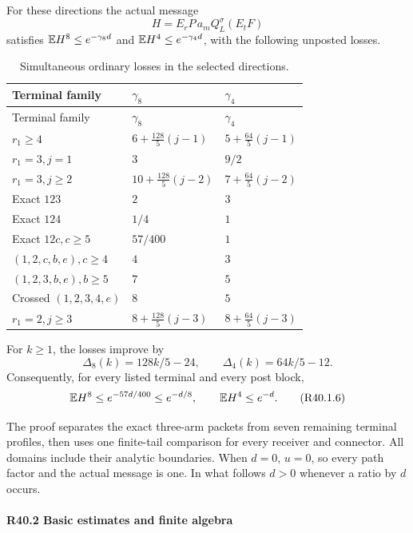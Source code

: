 \begin{proposition}\label{prop:r40:ordinary-catalogue}
For these directions the actual message
\[
 H=E_rP\,a_mQ_L^\sigma(E_tF)
 \tag{R40.1.5}
\]
satisfies \(\mathbb E H^8\le e^{-\gamma_8d}\) and
\(\mathbb E H^4\le e^{-\gamma_4d}\), with the following unposted losses.
\begingroup\small\setlength{\tabcolsep}{3pt}
\begin{longtable}{@{}p{.39\linewidth}p{.25\linewidth}p{.25\linewidth}@{}}
\caption{Simultaneous ordinary losses in the selected directions.}
\label{tab:r40:ordinary-losses}\\
\toprule Terminal family&\(\gamma_8\)&\(\gamma_4\)\\\midrule\endfirsthead
\toprule Terminal family&\(\gamma_8\)&\(\gamma_4\)\\\midrule\endhead
\bottomrule\endfoot
\(r_1\ge4\)&\(6+\frac{128}{5}(j-1)\)&\(5+\frac{64}{5}(j-1)\)\\
\(r_1=3,j=1\)&\(3\)&\(9/2\)\\
\(r_1=3,j\ge2\)&\(10+\frac{128}{5}(j-2)\)&\(7+\frac{64}{5}(j-2)\)\\
Exact \(123\)&\(2\)&\(3\)\\
Exact \(124\)&\(1/4\)&\(1\)\\
Exact \(12c,c\ge5\)&\(57/400\)&\(1\)\\
\((1,2,c,b,e),c\ge4\)&\(4\)&\(3\)\\
\((1,2,3,b,e),b\ge5\)&\(7\)&\(5\)\\
Crossed \((1,2,3,4,e)\)&\(8\)&\(5\)\\
\(r_1=2,j\ge3\)&\(8+\frac{128}{5}(j-3)\)&\(8+\frac{64}{5}(j-3)\)\\
\end{longtable}\endgroup
For \(k\ge1\), the losses improve by
\[
 \Delta_8(k)=128k/5-24,\qquad
 \Delta_4(k)=64k/5-12. \tag{R40.1.7}
\]
Consequently, for every listed terminal and every post block,
\[
 \mathbb E H^8\le e^{-57d/400}\le e^{-d/8},
 \qquad \mathbb E H^4\le e^{-d}. \tag{R40.1.6}
\]
\end{proposition}
The proof separates the exact three-arm packets from seven remaining
terminal profiles, then uses one finite-tail comparison for every
receiver and connector. All domains include their analytic boundaries.
When \(d=0\), \(u=0\), so every path factor and the actual message is
one. In what follows \(d>0\) whenever a ratio by \(d\) occurs.


\paragraph{R40.2 Basic estimates and finite algebra}

